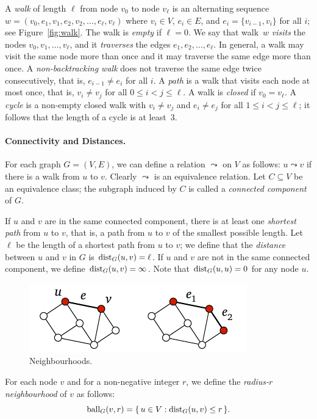 A \emph{walk} of length $\ell$ from node $v_0$ to node $v_\ell$ is an alternating sequence $w = (v_0, e_1, v_1, e_2, v_2, \dotsc, e_\ell, v_\ell)$ where $v_i \in V$, $e_i \in E$, and $e_i = \{ v_{i-1}, v_i \}$ for all $i$; see Figure~\ref{fig:walk}. The walk is \emph{empty} if $\ell = 0$. We say that walk~$w$ \emph{visits} the nodes $v_0, v_1, \dotsc, v_\ell$, and it \emph{traverses} the edges $e_1, e_2, \dotsc, e_\ell$. In general, a walk may visit the same node more than once and it may traverse the same edge more than once. A \emph{non-backtracking walk} does not traverse the same edge twice consecutively, that is, $e_{i-1} \ne e_i$ for all $i$. A \emph{path} is a walk that visits each node at most once, that is, $v_i \ne v_j$ for all $0 \le i < j \le \ell$. A walk is \emph{closed} if $v_0 = v_\ell$. A \emph{cycle} is a non-empty closed walk with $v_i \ne v_j$ and $e_i \ne e_j$ for all $1 \le i < j \le \ell$; it follows that the length of a cycle is at least~$3$.

\paragraph{Connectivity and Distances.}

For each graph $G = (V,E)$, we can define a relation $\leadsto$ on $V$ as follows: $u \leadsto v$ if there is a walk from $u$ to $v$. Clearly $\leadsto$ is an equivalence relation. Let $C \subseteq V$ be an equivalence class; the subgraph induced by $C$ is called a \emph{connected component} of $G$.

If $u$ and $v$ are in the same connected component, there is at least one \emph{shortest path} from $u$ to $v$, that is, a path from $u$ to $v$ of the smallest possible length. Let $\ell$ be the length of a shortest path from $u$ to $v$; we define that the \emph{distance} between $u$ and $v$ in $G$ is $\operatorname{dist}_G(u,v) = \ell$. If $u$ and $v$ are not in the same connected component, we define $\operatorname{dist}_G(u,v) = \infty$. Note that $\operatorname{dist}_G(u,u) = 0$ for any node $u$.

\begin{figure}
    \centering
    \includegraphics[page=\PNeighbourhood]{figs.pdf}
    \caption{Neighbourhoods.}\label{fig:neighbourhood}
\end{figure}
For each node $v$ and for a non-negative integer $r$, we define the \emph{radius-$r$ neighbourhood} of $v$ as follows:
\[
    \operatorname{ball}_G(v, r) = \{\,  u \in V : \operatorname{dist}_G(u,v) \le r  \,\}.
\]

